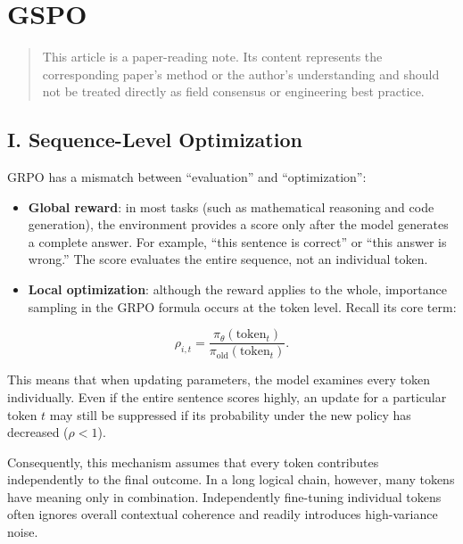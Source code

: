 \setcounter{section}{2}

\hypertarget{gspo}{%
\section{GSPO}\label{gspo}}

\begin{quote}
This article is a paper-reading note. Its content represents the corresponding paper's method or the author's understanding and should not be treated directly as field consensus or engineering best practice.
\end{quote}

\hypertarget{i.-sequence-level-optimization}{%
\subsection{I. Sequence-Level Optimization}\label{i.-sequence-level-optimization}}

GRPO has a mismatch between ``evaluation'' and ``optimization'':

\begin{itemize}
\tightlist
\item
  \textbf{Global reward}: in most tasks (such as mathematical reasoning and code generation), the environment provides a score only after the model generates a complete answer. For example, ``this sentence is correct'' or ``this answer is wrong.'' The score evaluates the entire sequence, not an individual token.
\item
{}
  \textbf{Local optimization}: although the reward applies to the whole, importance sampling in the GRPO formula occurs at the token level. Recall its core term:
\end{itemize}

\[
\rho_{i,t}
=
\frac{\pi_\theta(\mathrm{token}_t)}
{\pi_{\mathrm{old}}(\mathrm{token}_t)}.
\]

This means that when updating parameters, the model examines every token individually. Even if the entire sentence scores highly, an update for a particular token \(t\) may still be suppressed if its probability under the new policy has decreased (\(\rho<1\)).

Consequently, this mechanism assumes that every token contributes independently to the final outcome. In a long logical chain, however, many tokens have meaning only in combination. Independently fine-tuning individual tokens often ignores overall contextual coherence and readily introduces high-variance noise.

